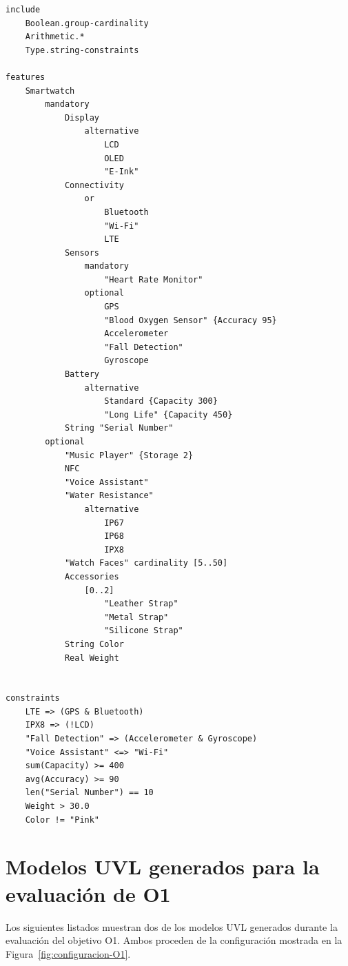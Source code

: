\begin{verbatim}
include
    Boolean.group-cardinality
    Arithmetic.*
    Type.string-constraints

features
    Smartwatch
        mandatory
            Display
                alternative
                    LCD
                    OLED
                    "E-Ink"
            Connectivity
                or
                    Bluetooth
                    "Wi-Fi"
                    LTE
            Sensors
                mandatory
                    "Heart Rate Monitor"
                optional
                    GPS
                    "Blood Oxygen Sensor" {Accuracy 95}
                    Accelerometer
                    "Fall Detection"
                    Gyroscope
            Battery
                alternative 
                    Standard {Capacity 300}
                    "Long Life" {Capacity 450}
            String "Serial Number"
        optional
            "Music Player" {Storage 2}
            NFC
            "Voice Assistant"
            "Water Resistance"
                alternative
                    IP67
                    IP68
                    IPX8
            "Watch Faces" cardinality [5..50]
            Accessories
                [0..2]
                    "Leather Strap"
                    "Metal Strap"
                    "Silicone Strap"
            String Color
            Real Weight


constraints
    LTE => (GPS & Bluetooth)
    IPX8 => (!LCD)
    "Fall Detection" => (Accelerometer & Gyroscope)
    "Voice Assistant" <=> "Wi-Fi"
    sum(Capacity) >= 400
    avg(Accuracy) >= 90
    len("Serial Number") == 10
    Weight > 30.0
    Color != "Pink"
\end{verbatim}
\label{app:modelo-uvl}
\caption{Ejemplo de modelo de características en UVL. Usado en la Sección \ref{sec:uvl}}


\section{Modelos UVL generados para la evaluación de O1}
\label{app:modelos-o1}

Los siguientes listados muestran dos de los modelos UVL generados durante la
evaluación del objetivo O1. Ambos proceden de la configuración mostrada en la
Figura~\ref{fig:configuracion-O1}.

